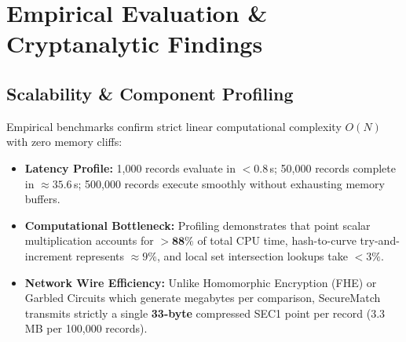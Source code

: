 \documentclass[10pt,a4paper]{article}
\begin{document}
\section{Empirical Evaluation \& Cryptanalytic Findings}

\subsection{Scalability \& Component Profiling}
Empirical benchmarks confirm strict linear computational complexity $O(N)$ with zero memory cliffs:
\begin{itemize}
    \item \textbf{Latency Profile:} 1,000 records evaluate in $< 0.8$\,s; 50,000 records complete in $\approx 35.6$\,s; 500,000 records execute smoothly without exhausting memory buffers.
    \item \textbf{Computational Bottleneck:} Profiling demonstrates that point scalar multiplication accounts for $\mathbf{> 88\%}$ of total CPU time, hash-to-curve try-and-increment represents $\approx 9\%$, and local set intersection lookups take $< 3\%$.
    \item \textbf{Network Wire Efficiency:} Unlike Homomorphic Encryption (FHE) or Garbled Circuits which generate megabytes per comparison, SecureMatch transmits strictly a single \textbf{33-byte} compressed SEC1 point per record ($3.3$\,MB per 100,000 records).
\end{itemize}
\end{document}
